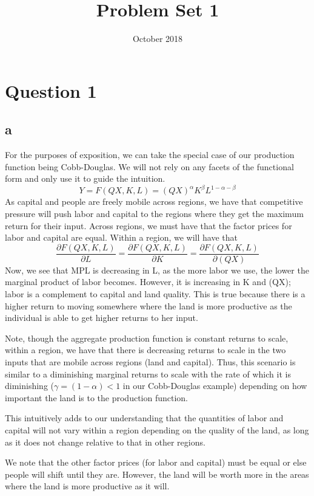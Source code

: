 \documentclass{article}
\title{Problem Set 1}
\author{ }
\date{October 2018}
\begin{document}
\maketitle

\section{Question 1}
\subsection*{a}
For the purposes of exposition, we can take the special case of our production function being Cobb-Douglas. We will not rely on any facets of the functional form and only use it to guide the intuition.
\begin{equation}
Y = F(QX,K,L) = (QX)^{\alpha}K^{\beta}L^{1-\alpha - \beta}
\end{equation}
As capital and people are freely mobile across regions, we have that competitive pressure will push labor and capital to the regions where they get the maximum return for their input. Across regions, we must have that the factor prices for labor and capital are equal.
Within a region, we will have that 
$$\frac{\partial{F(QX,K,L)}}{\partial L} = \frac{\partial F(QX,K,L)}{\partial K} = \frac{\partial F(QX,K,L)}{\partial (QX)} $$
Now, we see that MPL is decreasing in L, as the more labor we use, the lower the marginal product of labor becomes. However, it is increasing in K and (QX); labor is a complement to capital and land quality. This is true because there is a higher return to moving somewhere where the land is more productive as the individual is able to get higher returns to her input.   \par
Note, though the aggregate production function is constant returns to scale, within a region, we have that there is decreasing returns to scale in the two inputs that are mobile across regions (land and capital). Thus, this scenario is similar to a diminishing marginal returns to scale with the rate of which it is diminishing ($\gamma = (1-\alpha) <1$ in our Cobb-Douglas example) depending on how important the land is to the production function.\par 
This intuitively adds to our understanding that the quantities of labor and capital will not vary within a region depending on the quality of the land, as long as it does not change relative to that in other regions. \par
We note that the other factor prices (for labor and capital) must be equal or else people will shift until they are. However, the land will be worth more in the areas where the land is more productive as it will.
\pagebreak
\end{document}
